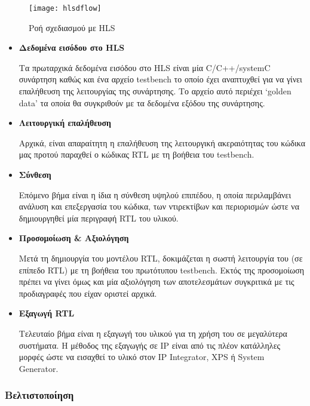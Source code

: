 \begin{figure}[H]
  	\centering
	\texttt{[image: hlsdflow]}\\
	\caption{Ροή σχεδιασμού με HLS \cite{Crockett:2014:ZBE:2685817}}
	\label{fig:hlsdflow}
\end{figure}

\begin{itemize}[label={},leftmargin=*]
	\item{\textbf{Δεδομένα εισόδου στο HLS}}

	Τα πρωταρχικά δεδομένα εισόδου στο HLS είναι μία C/C++/systemC συνάρτηση καθώς και ένα αρχείο testbench το οποίο έχει αναπτυχθεί για να γίνει επαλήθευση της λειτουργίας της συνάρτησης. Το αρχείο αυτό περιέχει `golden data' τα οποία θα συγκριθούν με τα δεδομένα εξόδου της συνάρτησης. \\

	\item{\textbf{Λειτουργική επαλήθευση}}

	Αρχικά, είναι απαραίτητη η επαλήθευση της λειτουργική ακεραιότητας του κώδικα μας προτού παραχθεί ο κώδικας RTL με τη βοήθεια του testbench. \\

	\item{\textbf{Σύνθεση}}

	Επόμενο βήμα είναι η ίδια η σύνθεση υψηλού επιπέδου, η οποία περιλαμβάνει ανάλυση και επεξεργασία του κώδικα, των ντιρεκτίβων και περιορισμών ώστε να δημιουργηθεί μία περιγραφή RTL του υλικού.\\


	\item{\textbf{Προσομοίωση \& Αξιολόγηση}}

	Μετά τη δημιουργία του μοντέλου RTL, δοκιμάζεται η σωστή λειτουργία του (σε επίπεδο RTL) με τη βοήθεια του πρωτότυπου testbench. Εκτός της προσομοίωση πρέπει να γίνει όμως και μία αξιολόγηση των αποτελεσμάτων συγκριτικά με τις προδιαγραφές που είχαν οριστεί αρχικά.\\

	\item{\textbf{Εξαγωγή RTL}}

	Τελευταίο βήμα είναι η εξαγωγή του υλικού για τη χρήση του σε μεγαλύτερα συστήματα. Η μέθοδος της εξαγωγής σε IP είναι από τις πλέον κατάλληλες μορφές ώστε να εισαχθεί το υλικό στον IP Integrator, XPS ή System Generator.

\end{itemize}
\subsubsection{Βελτιστοποίηση}


